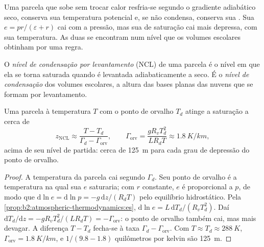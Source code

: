 Uma parcela que sobe sem trocar calor resfria-se segundo o gradiente adiabático seco, conserva sua
temperatura potencial e, se não condensa, conserva sua . Sua 
$e = pr/(\varepsilon + r)$ cai com a pressão, mas sua  de saturação cai
mais depressa, com sua temperatura. As duas se encontram num nível que os volumes escolares obtinham por uma regra.

\begin{definition}\label{def:b2:atmospheric-thermodynamics:lcl}
O \emph{nível de condensação por levantamento} (NCL) de uma parcela é o
nível em que ela se torna saturada quando é levantada adiabaticamente a seco. É o
\emph{nível de condensação} dos volumes escolares, a altura das
bases planas das nuvens que se formam por levantamento.
\end{definition}

\begin{proposition}\label{prop:b2:atmospheric-thermodynamics:lcl}
Uma parcela à temperatura $T$ com o ponto de orvalho $T_d$ atinge a saturação a cerca de
\[
  z_{\text{NCL}} \approx \frac{T - T_d}{\Gamma_d - \Gamma_{\text{orv}}}, \qquad
  \Gamma_{\text{orv}} = \frac{g R_v T_d^2}{L R_d T} \approx \qty{1.8}{K/km},
\]
acima de seu nível de partida: cerca de \qty{125}{m} para cada grau de depressão do ponto de orvalho.
\end{proposition}

\begin{proof}
A temperatura da parcela cai segundo $\Gamma_d$. Seu ponto de orvalho é a temperatura na qual sua
 $e$ saturaria; com $r$ constante, $e$ é proporcional a $p$, de modo que
$\mathrm{d}\ln e = \mathrm{d}\ln p = -g\,\mathrm{d}z/(R_dT)$ pelo equilíbrio hidrostático. Pela
\cref{prop:b2:atmospheric-thermodynamics:es}, $\mathrm{d}\ln e = L\,\mathrm{d}T_d/(R_vT_d^2)$.
Daí $\mathrm{d}T_d/\mathrm{d}z = -gR_vT_d^2/(LR_dT) = -\Gamma_{\text{orv}}$: o ponto de orvalho também cai,
mas mais devagar. A diferença $T - T_d$ fecha-se à taxa $\Gamma_d - \Gamma_{\text{orv}}$. Com
$T \approx T_d \approx \qty{288}{K}$, $\Gamma_{\text{orv}} = \qty{1.8}{K/km}$, e $1/(9.8 - 1.8)$
quilômetros por kelvin são \qty{125}{m}.
\end{proof}

